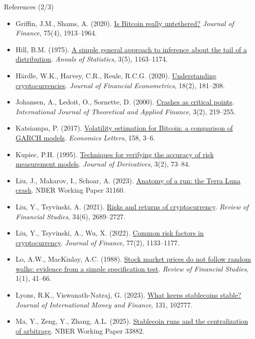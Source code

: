 \begin{frame}{References (2/3)}
\itemsize{\tiny}
\begin{itemize}
    \item Griffin, J.M., Shams, A. (2020). \href{https://doi.org/10.1111/jofi.12903}{Is Bitcoin really untethered?} \textit{Journal of Finance}, 75(4), 1913--1964.
    \item Hill, B.M. (1975). \href{https://doi.org/10.1214/aos/1176343247}{A simple general approach to inference about the tail of a distribution}. \textit{Annals of Statistics}, 3(5), 1163--1174.
    \item Härdle, W.K., Harvey, C.R., Reule, R.C.G. (2020). \href{https://doi.org/10.1093/jjfinec/nbz033}{Understanding cryptocurrencies}. \textit{Journal of Financial Econometrics}, 18(2), 181--208.
    \item Johansen, A., Ledoit, O., Sornette, D. (2000). \href{https://doi.org/10.1142/S0219024900000115}{Crashes as critical points}. \textit{International Journal of Theoretical and Applied Finance}, 3(2), 219--255.
    \item Katsiampa, P. (2017). \href{https://doi.org/10.1016/j.econlet.2017.06.023}{Volatility estimation for Bitcoin: a comparison of GARCH models}. \textit{Economics Letters}, 158, 3--6.
    \item Kupiec, P.H. (1995). \href{https://doi.org/10.3905/jod.1995.407942}{Techniques for verifying the accuracy of risk measurement models}. \textit{Journal of Derivatives}, 3(2), 73--84.
    \item Liu, J., Makarov, I., Schoar, A. (2023). \href{https://doi.org/10.3386/w31160}{Anatomy of a run: the Terra Luna crash}. NBER Working Paper 31160.
    \item Liu, Y., Tsyvinski, A. (2021). \href{https://doi.org/10.1093/rfs/hhaa113}{Risks and returns of cryptocurrency}. \textit{Review of Financial Studies}, 34(6), 2689--2727.
    \item Liu, Y., Tsyvinski, A., Wu, X. (2022). \href{https://doi.org/10.1111/jofi.13119}{Common risk factors in cryptocurrency}. \textit{Journal of Finance}, 77(2), 1133--1177.
    \item Lo, A.W., MacKinlay, A.C. (1988). \href{https://doi.org/10.1093/rfs/1.1.41}{Stock market prices do not follow random walks: evidence from a simple specification test}. \textit{Review of Financial Studies}, 1(1), 41--66.
    \item Lyons, R.K., Viswanath-Natraj, G. (2023). \href{https://doi.org/10.1016/j.jimonfin.2022.102777}{What keeps stablecoins stable?} \textit{Journal of International Money and Finance}, 131, 102777.
    \item Ma, Y., Zeng, Y., Zhang, A.L. (2025). \href{https://doi.org/10.3386/w33882}{Stablecoin runs and the centralization of arbitrage}. NBER Working Paper 33882.
\end{itemize}
\end{frame}

